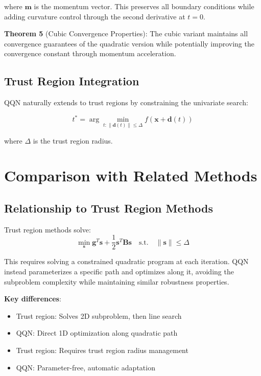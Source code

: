 where \(\mathbf{m}\) is the momentum vector. This preserves all boundary conditions while adding curvature control through the second derivative at \(t=0\).

\textbf{Theorem 5} (Cubic Convergence Properties): The cubic variant maintains all convergence guarantees of the quadratic version while potentially improving the convergence constant through momentum acceleration.

\hypertarget{trust-region-integration}{%
\subsection{Trust Region Integration}\label{trust-region-integration}}

QQN naturally extends to trust regions by constraining the univariate search:

\[t^* = \arg\min_{t: \|\mathbf{d}(t)\| \leq \Delta} f(\mathbf{x} + \mathbf{d}(t))\]

where \(\Delta\) is the trust region radius.

\hypertarget{comparison-with-related-methods}{%
\section{Comparison with Related Methods}\label{comparison-with-related-methods}}

\hypertarget{relationship-to-trust-region-methods}{%
\subsection{Relationship to Trust Region Methods}\label{relationship-to-trust-region-methods}}

Trust region methods solve:
\[\min_{\mathbf{s}} \mathbf{g}^T\mathbf{s} + \frac{1}{2}\mathbf{s}^T\mathbf{B}\mathbf{s} \quad \text{s.t.} \quad \|\mathbf{s}\| \leq \Delta\]

This requires solving a constrained quadratic program at each iteration. QQN instead parameterizes a specific path and optimizes along it, avoiding the subproblem complexity while maintaining similar robustness properties.

\textbf{Key differences}:

\begin{itemize}
\tightlist
\item
  Trust region: Solves 2D subproblem, then line search
\item
  QQN: Direct 1D optimization along quadratic path
\item
  Trust region: Requires trust region radius management
\item
  QQN: Parameter-free, automatic adaptation
\end{itemize}

